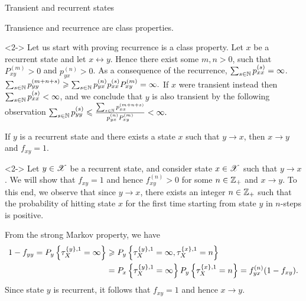 \documentclass[12pt,aspectratio=169]{beamer}
\begin{document}
\begin{frame}{Transient and recurrent states}

\begin{prop}
Transience and recurrence are class properties.
\end{prop}
\begin{Proof}<2->
Let us start with proving recurrence is a class property. 
Let $x$ be a recurrent state and let $x \leftrightarrow y$. 
Hence there exist some $m,n >0$, such that $P_{xy}^{(m)} > 0$ and $p_{yx}^{(n)}>0$. 
As a consequence of the recurrence, $\sum_{s \in \mathbb{N}} p_{xx}^{(s)} = \infty$. 
$
\sum_{s \in \mathbb{N}} p_{yy}^{(m+n+s)} \geqslant \sum_{s \in \mathbb{N}} p_{yx}^{(n)} p_{xx}^{(s)} P_{xy}^{(m)} = \infty.
$
If $x$ were transient instead then $\sum_{s\in\mathbb{N}}p_{xx}^{(s)}<\infty$, and we conclude that $y$ is also transient by the following observation
$
\sum_{s \in \mathbb{N}}  p_{yy}^{(s)} \leqslant \frac{\sum_{s \in \mathbb{N}} p_{xx}^{(m+n+s)} }{ p_{yx}^{(n)} P_{xy}^{(m)}}< \infty.
$
\end{Proof}
\end{frame}
\begin{frame}
\begin{cor}
If $y$ is a recurrent state and there exists a state $x$ such that $y \to x$, then $x \to y$ and $f_{xy} = 1$.
\end{cor}
\begin{Proof}<2-> 
Let $y \in \mathscr{X}$ be a recurrent state, and consider state $x \in \mathscr{X}$ such that $y \to x$. 
We will show that $f_{xy} = 1$ and hence $f_{xy}^{(n)} > 0$ for some $n \in \mathbb{Z}_+$ and $x \to y$. 
To this end, we observe that since $y \to x$, 
there exists an integer $n \in \mathbb{Z}_+$ such that the probability of hitting state $x$ for the first time starting from state $y$ in $n$-steps is positive. 
\end{Proof}
\end{frame}

\begin{frame}
\begin{Proof}
From the strong Markov property, we have 
\begin{align*}
1-f_{yy} = P_y\set{\tau_X^{\set{y},1} = \infty} 
&\ge P_y\set{\tau_X^{\set{y},1} = \infty, \tau_X^{\set{x},1}  = n} \\
&= P_x\set{\tau_X^{\set{y},1} = \infty}P_y\set{\tau_X^{\set{x},1}  = n} = f_{yx}^{(n)}(1-f_{xy}). %
\end{align*}
Since state $y$ is recurrent, it follows that $f_{xy} = 1$ and hence $x \to y$. 
\end{Proof}
\end{frame}
\end{document}
